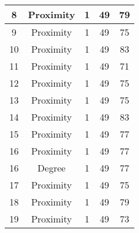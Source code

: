 \documentclass[results.tex]{subfiles}
\begin{document}
\begin{center}
\begin{tabular}{| c || c | c | c | c |}
            \hline
            8                       & Proximity                    & 1                      & 49                      & 79                   \\
            \hline
            9                       & Proximity                    & 1                      & 49                      & 75                   \\
            \hline
            10                      & Proximity                    & 1                      & 49                      & 83                   \\
            \hline
            11                      & Proximity                    & 1                      & 49                      & 71                   \\
            \hline
            12                      & Proximity                    & 1                      & 49                      & 75                   \\
            \hline
            13                      & Proximity                    & 1                      & 49                      & 75                   \\
            \hline
            14                      & Proximity                    & 1                      & 49                      & 83                   \\
            \hline
            15                      & Proximity                    & 1                      & 49                      & 77                   \\
            \hline
            16                      & Proximity                    & 1                      & 49                      & 77                   \\
            \hline
            16                      & Degree                       & 1                      & 49                      & 77                   \\
            \hline
            17                      & Proximity                    & 1                      & 49                      & 75                   \\
            \hline
            18                      & Proximity                    & 1                      & 49                      & 79                   \\
            \hline
            19                      & Proximity                    & 1                      & 49                      & 73                   \\

\end{tabular}
\end{center}
\end{document}
